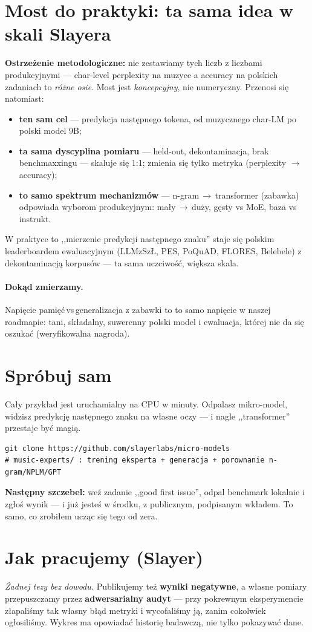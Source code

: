 \documentclass[11pt]{article}
\begin{document}
\section{Most do praktyki: ta sama idea w skali Slayera}
\textbf{Ostrzeżenie metodologiczne:} nie zestawiamy tych liczb z liczbami produkcyjnymi --- char-level perplexity
na muzyce a accuracy na polskich zadaniach to \emph{różne osie}. Most jest \emph{koncepcyjny}, nie numeryczny.
Przenosi się natomiast:
\begin{itemize}
  \item \textbf{ten sam cel} --- predykcja następnego tokena, od muzycznego char-LM po polski model 9B;
  \item \textbf{ta sama dyscyplina pomiaru} --- held-out, dekontaminacja, brak benchmaxxingu --- skaluje się 1:1;
        zmienia się tylko metryka (perplexity $\to$ accuracy);
  \item \textbf{to samo spektrum mechanizmów} --- n-gram\,$\to$\,transformer (zabawka) odpowiada wyborom
        produkcyjnym: mały\,$\to$\,duży, gęsty vs MoE, baza vs instrukt.
\end{itemize}
W praktyce to ,,mierzenie predykcji następnego znaku'' staje się polskim leaderboardem ewaluacyjnym
(LLMzSzŁ, PES, PoQuAD, FLORES, Belebele) z dekontaminacją korpusów --- ta sama uczciwość, większa skala.

\paragraph{Dokąd zmierzamy.} Napięcie pamięć\,vs\,generalizacja z zabawki to to samo napięcie w naszej
roadmapie: tani, składalny, suwerenny polski model i ewaluacja, której nie da się oszukać (weryfikowalna nagroda).

\section{Spróbuj sam}
Cały przykład jest uruchamialny na CPU w minuty. Odpalasz mikro-model, widzisz predykcję następnego znaku
na własne oczy --- i nagle ,,transformer'' przestaje być magią.
\begin{verbatim}
git clone https://github.com/slayerlabs/micro-models
# music-experts/ : trening eksperta + generacja + porownanie n-gram/NPLM/GPT
\end{verbatim}
\textbf{Następny szczebel:} weź zadanie ,,good first issue'', odpal benchmark lokalnie i zgłoś wynik --- i już
jesteś w środku, z publicznym, podpisanym wkładem. To samo, co zrobiłem ucząc się tego od zera.

\section{Jak pracujemy (Slayer)}
\emph{Żadnej tezy bez dowodu.} Publikujemy też \textbf{wyniki negatywne}, a własne pomiary przepuszczamy przez
\textbf{adwersarialny audyt} --- przy pokrewnym eksperymencie złapaliśmy tak własny błąd metryki i wycofaliśmy ją,
zanim cokolwiek ogłosiliśmy. Wykres ma opowiadać historię badawczą, nie tylko pokazywać dane.
\end{document}
